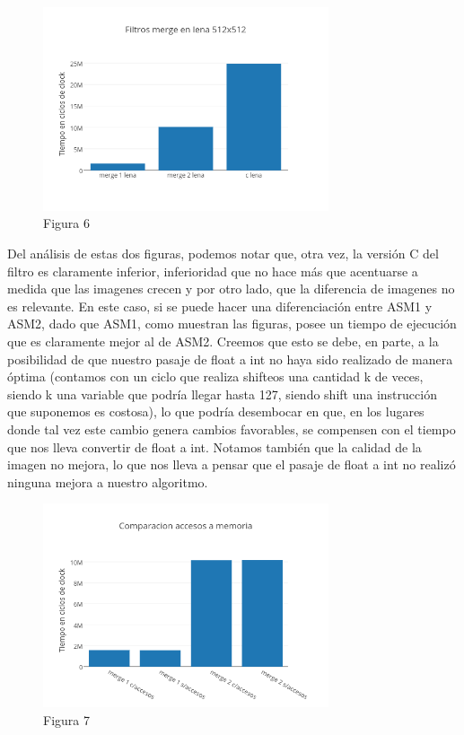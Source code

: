 \documentclass[a4paper]{article}
\begin{document}
\begin{figure}[h]
  \centering
    \includegraphics[width=0.75\textwidth]{imagenes/FiltrosMergeEnLena512x512.png}
  \caption{Figura 6}
  \label{fig:graficomerge2}
\end{figure}
 \FloatBarrier

Del análisis de estas dos figuras, podemos notar que, otra vez, la versión C del filtro es claramente inferior, inferioridad que no hace más que acentuarse a medida que las imagenes crecen y por otro lado, que la diferencia de imagenes no es relevante. En este caso, si se puede hacer una diferenciación entre ASM1 y ASM2, dado que ASM1, como muestran las figuras, posee un tiempo de ejecución que es claramente mejor al de ASM2. Creemos que esto se debe, en parte, a la posibilidad de que nuestro pasaje de float a int no haya sido realizado de manera óptima (contamos con un ciclo que realiza shifteos una cantidad k de veces, siendo k una variable que podría llegar hasta 127, siendo shift una instrucción que suponemos es costosa), lo que podría desembocar en que, en los lugares donde tal vez este cambio genera cambios favorables, se compensen con el tiempo que nos lleva convertir de float a int.	Notamos también que la calidad de la imagen no mejora, lo que nos lleva a pensar que el pasaje de float a int no realizó ninguna mejora a nuestro algoritmo. 

\begin{figure}[h]
  \centering
    \includegraphics[width=0.75\textwidth]{imagenes/ComparacionAccesosAMemoriaMergeColores.png}
  \caption{Figura 7}
  \label{fig:graficomerge3}
\end{figure}
 \FloatBarrier
 
\end{document}
